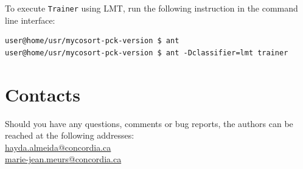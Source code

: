 \documentclass[11pt]{article}
\begin{document}
To execute \texttt{Trainer} using LMT, run the following instruction in the command line interface:
\begin{lstlisting}
user@home/usr/mycosort-pck-version $ ant
user@home/usr/mycosort-pck-version $ ant -Dclassifier=lmt trainer
\end{lstlisting}


\section{Contacts}
Should you have any questions, comments or bug reports, the authors can be reached at the following addresses:\\
\url{hayda.almeida@concordia.ca} \\
\url{marie-jean.meurs@concordia.ca}


\appendix




\end{document}
